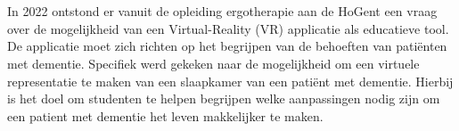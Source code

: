 
\chapter{}%
\label{ch:inleiding}

\section{}%
\label{sec:probleemstelling}



In 2022 ontstond er vanuit de opleiding ergotherapie aan de HoGent een vraag over de mogelijkheid van een Virtual-Reality (VR) applicatie als educatieve tool. De applicatie moet zich richten op het begrijpen van de behoeften van patiënten met dementie. Specifiek werd gekeken naar de mogelijkheid om een virtuele representatie te maken van een slaapkamer van een patiënt met dementie. Hierbij is het doel om studenten te helpen begrijpen welke aanpassingen nodig zijn om een patient met dementie het leven makkelijker te maken. 

